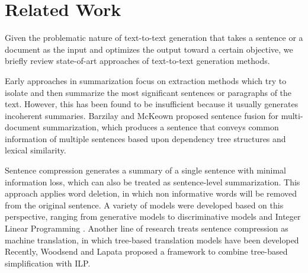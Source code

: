 \documentclass[10pt]{article}
\begin{document}
\section{Related Work}
\label{sec:RelatedWork}



Given the problematic nature of text-to-text generation that takes a sentence or a document as the input and optimizes the output toward a certain objective, we briefly review state-of-art approaches of text-to-text generation methods.

Early approaches in summarization focus on extraction methods which try to isolate and then summarize the most significant sentences or paragraphs of the text.
However, this has been found to be insufficient because it usually generates incoherent summaries. 
Barzilay and McKeown  proposed sentence fusion for multi-document summarization, which produces a sentence that conveys common information of multiple sentences based upon dependency tree structures and lexical similarity.

Sentence compression generates a summary of a single sentence with minimal information loss, which can also be treated as sentence-level summarization. 
This approach applies word deletion, in which non informative words will be removed from the original sentence.
A variety of models were developed based on this perspective, ranging from generative models \cite{Knight-Marcu:2002,Turner:2005} to discriminative models \cite{McDonald:2006} and Integer Linear Programming \cite{Clarke:2008}.
Another line of research treats sentence compression as machine translation, in which tree-based translation models have been developed \cite{Galley&McKeown:07,CohnLapata:2008,Zhu:2010} 
Recently, Woodsend and Lapata  proposed a framework to combine tree-based simplification with ILP.
\end{document}
